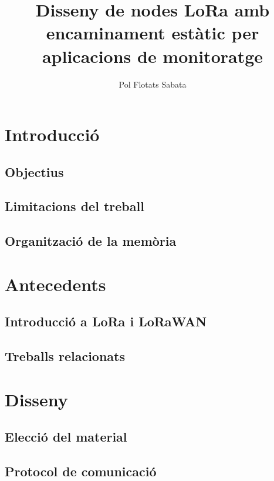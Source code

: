 \documentclass{tfgitic}[2024/07/01]
\title{Disseny de nodes LoRa amb encaminament estàtic per aplicacions de monitoratge}
\author{Pol Flotats Sabata}
\begin{document}

\chapter{Introducció}
\section{Objectius}
\section{Limitacions del treball}
\section{Organització de la memòria}

\chapter{Antecedents}
\section{Introducció a LoRa i LoRaWAN}
\section{Treballs relacionats}

\chapter{Disseny} %
\section{Elecció del material}
\section{Protocol de comunicació}
\end{document}
